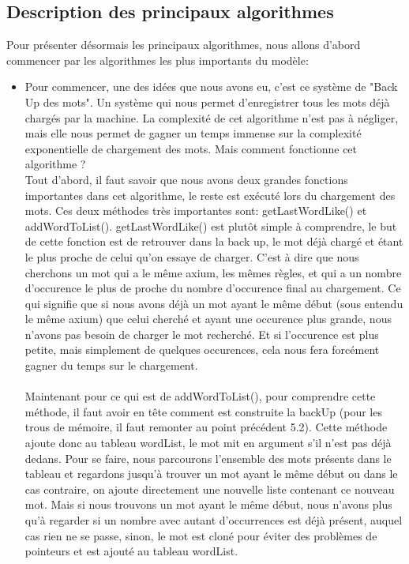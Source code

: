 \documentclass[a4paper,12pt]{article}
\begin{document}
\subsection{Description des principaux algorithmes}

Pour présenter désormais les principaux algorithmes, nous allons d'abord commencer par les algorithmes les plus importants du modèle:
\\
\begin{itemize}[label=\textbullet, font=\small]
    \item Pour commencer, une des idées que nous avons eu, c'est ce système de "Back Up des mots". Un système qui nous permet d'enregistrer tous les mots déjà chargés par la machine. La complexité de cet algorithme n'est pas à négliger, mais elle nous permet de gagner un temps immense sur la complexité exponentielle de chargement des mots. Mais comment fonctionne cet algorithme ?
    \\
    Tout d'abord, il faut savoir que nous avons deux grandes fonctions importantes dans cet algorithme, le reste est exécuté lors du chargement des mots. Ces deux méthodes très importantes sont: getLastWordLike() et addWordToList(). 
    getLastWordLike() est plutôt simple à comprendre, le but de cette fonction est de retrouver dans la back up, le mot déjà chargé et étant le plus proche de celui qu'on essaye de charger. C'est à dire que nous cherchons un mot qui a le même axium, les mêmes règles, et qui a un nombre d'occurence le plus de proche du nombre d'occurence final au chargement. Ce qui signifie que si nous avons déjà un mot ayant le même début (sous entendu le même axium) que celui cherché et ayant une occurence plus grande, nous n'avons pas besoin de charger le mot recherché. Et si l'occurence est plus petite, mais simplement de quelques occurences, cela nous fera forcément gagner du temps sur le chargement.
    \\\\
    Maintenant pour ce qui est de addWordToList(), pour comprendre cette méthode, il faut avoir en tête comment est construite la backUp (pour les trous de mémoire, il faut remonter au point précédent 5.2). Cette méthode ajoute donc au tableau wordList, le mot mit en argument s'il n'est pas déjà dedans. Pour se faire, nous parcourons l'ensemble des mots présents dans le tableau et regardons jusqu'à trouver un mot ayant le même début ou dans le cas contraire, on ajoute directement une nouvelle liste contenant ce nouveau mot. Mais si nous trouvons un mot ayant le même début, nous n'avons plus qu'à regarder si un nombre avec autant d'occurrences est déjà présent, auquel cas rien ne se passe, sinon, le mot est cloné pour éviter des problèmes de pointeurs et est ajouté au tableau wordList.

\end{itemize}
\end{document}
